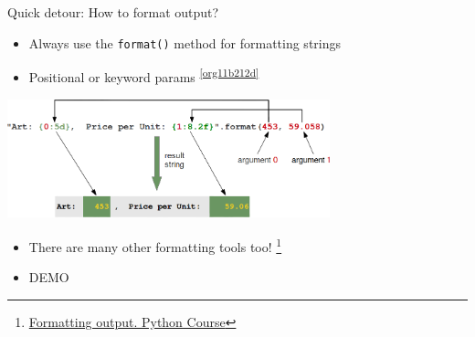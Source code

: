 \documentclass[presentation]{beamer}
\begin{document}
\begin{frame}[label={sec:orge2d6695},fragile]{Quick detour: How to format output?}
 \begin{itemize}
\item Always use the \texttt{format()} method for formatting strings
\item Positional or keyword params \textsuperscript{\cref{org11b212d}}
\end{itemize}
\begin{center}
\includegraphics[width=0.7\textwidth]{images/format_method_positional_parameters.png}
\end{center}
\begin{itemize}
\item There are many other formatting tools too! \footnote{\href{https://www.python-course.eu/python3\_formatted\_output.php}{Formatting output. Python Course}}
\item \alert{DEMO}
\end{itemize}
\end{frame}
\end{document}

